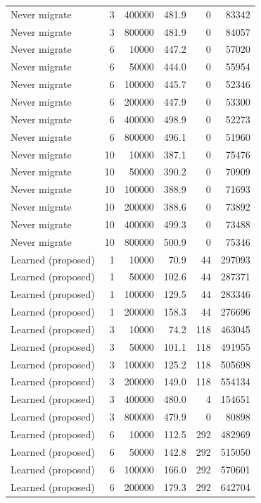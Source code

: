 \begin{table}[h]
\begin{tabular}{@{}lrrrrr@{}}
Never migrate & 3 & 400000 & 481.9 & 0 & 83342 \\
Never migrate & 3 & 800000 & 481.9 & 0 & 84057 \\
Never migrate & 6 & 10000 & 447.2 & 0 & 57020 \\
Never migrate & 6 & 50000 & 444.0 & 0 & 55954 \\
Never migrate & 6 & 100000 & 445.7 & 0 & 52346 \\
Never migrate & 6 & 200000 & 447.9 & 0 & 53300 \\
Never migrate & 6 & 400000 & 498.9 & 0 & 52273 \\
Never migrate & 6 & 800000 & 496.1 & 0 & 51960 \\
Never migrate & 10 & 10000 & 387.1 & 0 & 75476 \\
Never migrate & 10 & 50000 & 390.2 & 0 & 70909 \\
Never migrate & 10 & 100000 & 388.9 & 0 & 71693 \\
Never migrate & 10 & 200000 & 388.6 & 0 & 73892 \\
Never migrate & 10 & 400000 & 499.3 & 0 & 73488 \\
Never migrate & 10 & 800000 & 500.9 & 0 & 75346 \\
Learned (proposed) & 1 & 10000 & 70.9 & 44 & 297093 \\
Learned (proposed) & 1 & 50000 & 102.6 & 44 & 287371 \\
Learned (proposed) & 1 & 100000 & 129.5 & 44 & 283346 \\
Learned (proposed) & 1 & 200000 & 158.3 & 44 & 276696 \\
Learned (proposed) & 3 & 10000 & 74.2 & 118 & 463045 \\
Learned (proposed) & 3 & 50000 & 101.1 & 118 & 491955 \\
Learned (proposed) & 3 & 100000 & 125.2 & 118 & 505698 \\
Learned (proposed) & 3 & 200000 & 149.0 & 118 & 554134 \\
Learned (proposed) & 3 & 400000 & 480.0 & 4 & 154651 \\
Learned (proposed) & 3 & 800000 & 479.9 & 0 & 80898 \\
Learned (proposed) & 6 & 10000 & 112.5 & 292 & 482969 \\
Learned (proposed) & 6 & 50000 & 142.8 & 292 & 515050 \\
Learned (proposed) & 6 & 100000 & 166.0 & 292 & 570601 \\
Learned (proposed) & 6 & 200000 & 179.3 & 292 & 642704 \\

\end{tabular}
\end{table}
